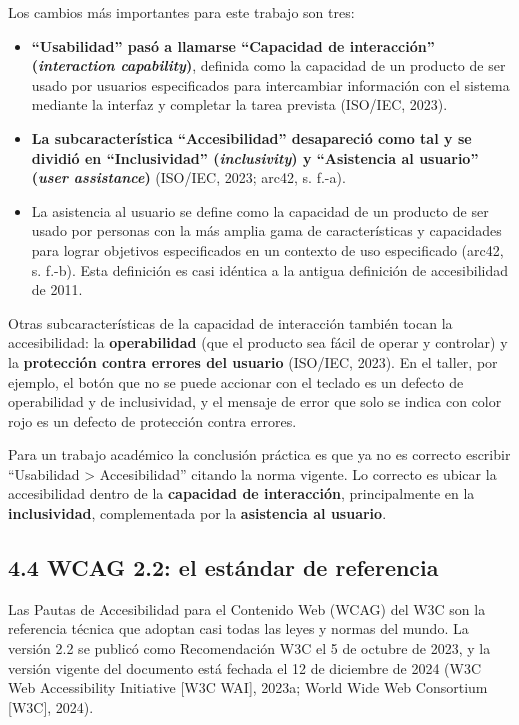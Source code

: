 \documentclass[10pt,letterpaper,onecolumn]{IEEEtran}
\begin{document}
Los cambios más importantes para este trabajo son tres:

\begin{itemize}
\item
  \textbf{``Usabilidad'' pasó a llamarse ``Capacidad de interacción'' (\emph{interaction capability})}, definida como la capacidad de un producto de ser usado por usuarios especificados para intercambiar información con el sistema mediante la interfaz y completar la tarea prevista (ISO/IEC, 2023).
\item
  \textbf{La subcaracterística ``Accesibilidad'' desapareció como tal y se dividió en ``Inclusividad'' (\emph{inclusivity}) y ``Asistencia al usuario'' (\emph{user assistance})} (ISO/IEC, 2023; arc42, s. f.-a).
\item
  La asistencia al usuario se define como la capacidad de un producto de ser usado por personas con la más amplia gama de características y capacidades para lograr objetivos especificados en un contexto de uso especificado (arc42, s. f.-b). Esta definición es casi idéntica a la antigua definición de accesibilidad de 2011.
\end{itemize}

Otras subcaracterísticas de la capacidad de interacción también tocan la accesibilidad: la \textbf{operabilidad} (que el producto sea fácil de operar y controlar) y la \textbf{protección contra errores del usuario} (ISO/IEC, 2023). En el taller, por ejemplo, el botón que no se puede accionar con el teclado es un defecto de operabilidad y de inclusividad, y el mensaje de error que solo se indica con color rojo es un defecto de protección contra errores.

Para un trabajo académico la conclusión práctica es que ya no es correcto escribir ``Usabilidad \textgreater{} Accesibilidad'' citando la norma vigente. Lo correcto es ubicar la accesibilidad dentro de la \textbf{capacidad de interacción}, principalmente en la \textbf{inclusividad}, complementada por la \textbf{asistencia al usuario}.

\subsection{4.4 WCAG 2.2: el estándar de referencia}\label{wcag-2.2-el-estuxe1ndar-de-referencia}

Las Pautas de Accesibilidad para el Contenido Web (WCAG) del W3C son la referencia técnica que adoptan casi todas las leyes y normas del mundo. La versión 2.2 se publicó como Recomendación W3C el 5 de octubre de 2023, y la versión vigente del documento está fechada el 12 de diciembre de 2024 (W3C Web Accessibility Initiative {[}W3C WAI{]}, 2023a; World Wide Web Consortium {[}W3C{]}, 2024).
\end{document}
